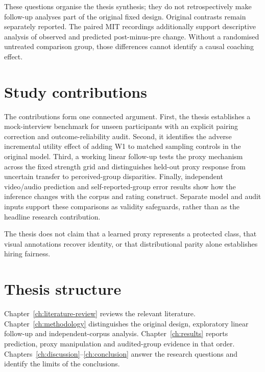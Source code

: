 These questions organise the thesis synthesis; they do not retrospectively make follow-up
analyses part of the original fixed design. Original contrasts remain separately reported.
The paired MIT recordings additionally support descriptive analysis of observed and predicted
post-minus-pre change. Without a randomised untreated comparison group, those differences
cannot identify a causal coaching effect.

\section{Study contributions}

The contributions form one connected argument. First, the thesis establishes a mock-interview
benchmark for unseen participants with an explicit pairing correction and outcome-reliability audit.
Second, it identifies the adverse incremental utility effect of adding W1 to matched sampling
controls in the original model. Third, a working linear follow-up tests the proxy mechanism
across the fixed strength grid and distinguishes held-out proxy response from uncertain transfer
to perceived-group disparities. Finally, independent video/audio prediction and self-reported-group
error results show how the inference changes with the corpus and rating construct. Separate
model and audit inputs support these comparisons as validity safeguards, rather than as the
headline research contribution.

The thesis does not claim that a learned proxy represents a protected class, that visual
annotations recover identity, or that distributional parity alone establishes hiring fairness.

\section{Thesis structure}

Chapter~\ref{ch:literature-review} reviews the relevant literature.
Chapter~\ref{ch:methodology} distinguishes the original design, exploratory linear follow-up and
independent-corpus analysis. Chapter~\ref{ch:results} reports prediction, proxy manipulation and
audited-group evidence in that order. Chapters~\ref{ch:discussion}--\ref{ch:conclusion} answer the
research questions and identify the limits of the conclusions.

